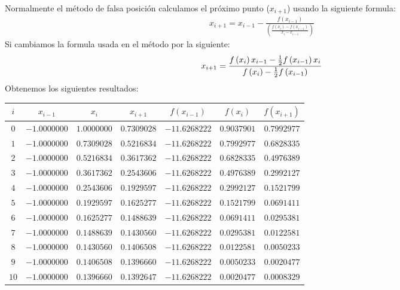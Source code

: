 
Normalmente el método de falsa posición calculamos el próximo
punto ($x_{i+1}$) usando la siguiente formula:
\begin{align*}
	x_{i+1} = x_{i-1} - \frac{f(x_{i-1})}{ \left( \frac{f(x_{i}) - f(x_{i-1})}{x_{i} - x_{i-1}}  \right) }
\end{align*}
Si cambiamos la formula usada en el método por la siguiente:
\begin{align*}
	x_{i+1} = \frac{ f \left( x_{i} \right) x_{i-1} - \frac{1}{2} f \left( x_{i-1} \right) x_{i} } 
	{ f \left( x_{i} \right) - \frac{1}{2} f \left( x_{i-1} \right) }
\end{align*}
Obtenemos los siguientes resultados:

\begin{center}
	\begin{longtable}{|c|c|c|c|c|c|c|} \hline
		$i$ & $x_{i-1}$ & $x_{i}$ & $x_{i+1}$ & $f(x_{i-1})$ & $f(x_{i})$ & $f(x_{i+1})$ \\ \hline
		$0$ & $-1.0000000$ & $1.0000000$ & $0.7309028$ & $-11.6268222$ & $0.9037901$ & $0.7992977$ \\ \hline
		$1$ & $-1.0000000$ & $0.7309028$ & $0.5216834$ & $-11.6268222$ & $0.7992977$ & $0.6828335$ \\ \hline
		$2$ & $-1.0000000$ & $0.5216834$ & $0.3617362$ & $-11.6268222$ & $0.6828335$ & $0.4976389$ \\ \hline
		$3$ & $-1.0000000$ & $0.3617362$ & $0.2543606$ & $-11.6268222$ & $0.4976389$ & $0.2992127$ \\ \hline
		$4$ & $-1.0000000$ & $0.2543606$ & $0.1929597$ & $-11.6268222$ & $0.2992127$ & $0.1521799$ \\ \hline
		$5$ & $-1.0000000$ & $0.1929597$ & $0.1625277$ & $-11.6268222$ & $0.1521799$ & $0.0691411$ \\ \hline
		$6$ & $-1.0000000$ & $0.1625277$ & $0.1488639$ & $-11.6268222$ & $0.0691411$ & $0.0295381$ \\ \hline
		$7$ & $-1.0000000$ & $0.1488639$ & $0.1430560$ & $-11.6268222$ & $0.0295381$ & $0.0122581$ \\ \hline
		$8$ & $-1.0000000$ & $0.1430560$ & $0.1406508$ & $-11.6268222$ & $0.0122581$ & $0.0050233$ \\ \hline
		$9$ & $-1.0000000$ & $0.1406508$ & $0.1396660$ & $-11.6268222$ & $0.0050233$ & $0.0020477$ \\ \hline
		$10$ & $-1.0000000$ & $0.1396660$ & $0.1392647$ & $-11.6268222$ & $0.0020477$ & $0.0008329$ \\ \hline

\end{longtable}
\end{center}
